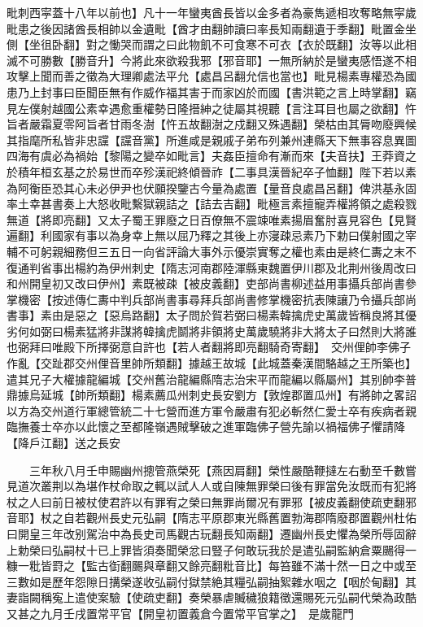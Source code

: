 毗刺西寜蓋十八年以前也】凡十一年蠻夷酋長皆以金多者為豪雋遞相攻奪略無寜歲毗患之後因諸酋長相帥以金遺毗【酋才由翻帥讀曰率長知兩翻遺于季翻】毗置金坐側【坐徂卧翻】對之慟哭而謂之曰此物飢不可食寒不可衣【衣於既翻】汝等以此相滅不可勝數【勝音升】今將此來欲殺我邪【邪音耶】一無所納於是蠻夷感悟遂不相攻擊上聞而善之徵為大理卿處法平允【處昌呂翻允信也當也】毗見楊素專權恐為國患乃上封事曰臣聞臣無有作威作福其害于而家凶於而國【書洪範之言上時掌翻】竊見左僕射越國公素幸遇愈重權勢日隆搢紳之徒屬其視聽【言注耳目也屬之欲翻】忤旨者嚴霜夏零阿旨者甘雨冬澍【忤五故翻澍之戍翻又殊遇翻】榮枯由其脣吻廢興候其指麾所私皆非忠讜【讜音黨】所進咸是親戚子弟布列兼州連縣天下無事容息異圖四海有虞必為禍始【黎陽之變卒如毗言】夫姦臣擅命有漸而來【夫音扶】王莽資之於積年桓玄基之於易世而卒殄漢祀終傾晉祚【二事具漢晉紀卒子恤翻】陛下若以素為阿衡臣恐其心未必伊尹也伏願揆鑒古今量為處置【量音良處昌呂翻】俾洪基永固率土幸甚書奏上大怒收毗繫獄親詰之【詰去吉翻】毗極言素擅寵弄權將領之處殺戮無道【將即亮翻】又太子蜀王罪廢之日百僚無不震竦唯素揚眉奮肘喜見容色【見賢遍翻】利國家有事以為身幸上無以屈乃釋之其後上亦寖疎忌素乃下勅曰僕射國之宰輔不可躬親細務但三五日一向省評論大事外示優崇實奪之權也素由是終仁夀之末不復通判省事出楊約為伊州刺史【隋志河南郡陸渾縣東魏置伊川郡及北荆州後周改曰和州開皇初又改曰伊州】素既被疎【被皮義翻】吏部尚書柳述益用事攝兵部尚書參掌機密【按述傳仁夀中判兵部尚書事尋拜兵部尚書修掌機密抗表陳讓乃令攝兵部尚書事】素由是惡之【惡烏路翻】太子問於賀若弼曰楊素韓擒虎史萬歲皆稱良將其優劣何如弼曰楊素猛將非謀將韓擒虎鬬將非領將史萬歲驍將非大將太子曰然則大將誰也弼拜曰唯殿下所擇弼意自許也【若人者翻將即亮翻騎奇寄翻】　交州俚帥李佛子作亂【交趾郡交州俚音里帥所類翻】據越王故城【此城蓋秦漢間駱越之王所築也】遣其兄子大權據龍編城【交州舊治龍編縣隋志治宋平而龍編以縣屬州】其别帥李普鼎據烏延城【帥所類翻】楊素薦瓜州刺史長安劉方【敦煌郡置瓜州】有將帥之畧詔以方為交州道行軍總管統二十七營而進方軍令嚴肅有犯必斬然仁愛士卒有疾病者親臨撫養士卒亦以此懷之至都隆嶺遇賊擊破之進軍臨佛子營先諭以禍福佛子懼請降【降戶江翻】送之長安

　　三年秋八月壬申賜幽州摠管燕榮死【燕因肩翻】榮性嚴酷鞭撻左右動至千數嘗見道次叢荆以為堪作杖命取之輒以試人人或自陳無罪榮曰後有罪當免汝既而有犯將杖之人曰前日被杖使君許以有罪宥之榮曰無罪尚爾况有罪邪【被皮義翻使疏吏翻邪音耶】杖之自若觀州長史元弘嗣【隋志平原郡東光縣舊置勃海郡隋廢郡置觀州杜佑曰開皇三年改别駕治中為長史司馬觀古玩翻長知兩翻】遷幽州長史懼為榮所辱固辭上勅榮曰弘嗣杖十已上罪皆須奏聞榮忿曰豎子何敢玩我於是遣弘嗣監納倉粟颺得一糠一粃皆罸之【監古衘翻颺與章翻又餘亮翻粃音比】每笞雖不滿十然一日之中或至三數如是歷年怨隙日搆榮遂收弘嗣付獄禁絶其糧弘嗣抽絮雜水咽之【咽於甸翻】其妻詣闕稱寃上遣使案驗【使疏吏翻】奏榮暴虐贓穢狼籍徵還賜死元弘嗣代榮為政酷又甚之九月壬戌置常平官【開皇初置義倉今置常平官掌之】　是歲龍門

